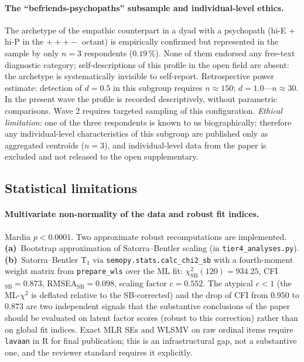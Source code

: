 \paragraph{The ``befriends-psychopaths'' subsample and individual-level ethics.}
\label{subsec:limitations_befriends}
The archetype of the empathic counterpart in a dyad with a psychopath (hi-E $+$ hi-P in the $+++-$ octant) is empirically confirmed but represented in the sample by only $n = 3$ respondents ($0.19\,\%$). None of them endorsed any free-text diagnostic category; self-descriptions of this profile in the open field are absent: the archetype is systematically invisible to self-report. Retrospective power estimate: detection of $d = 0.5$ in this subgroup requires $n \approx 150$; $d = 1.0$---$n \approx 30$. In the present wave the profile is recorded descriptively, without parametric comparisons. Wave 2 requires targeted sampling of this configuration. \emph{Ethical limitation:} one of the three respondents is known to us biographically; therefore any individual-level characteristics of this subgroup are published only as aggregated centroids ($n = 3$), and individual-level data from the paper is excluded and not released to the open supplementary.

\subsection{Statistical limitations}

\paragraph{Multivariate non-normality of the data and robust fit indices.} Mardia $p < 0.0001$. Two approximate robust recomputations are implemented. \textbf{(a)}~Bootstrap approximation of Satorra--Bentler scaling (in \texttt{tier4\_analyses.py}). \textbf{(b)}~Satorra--Bentler T$_1$ via \texttt{semopy.stats.calc\_chi2\_sb} with a fourth-moment weight matrix from \texttt{prepare\_wls} over the ML fit: $\chi^2_{\mathrm{SB}}(120) = 934.25$, CFI$_{\mathrm{SB}} = 0.873$, RMSEA$_{\mathrm{SB}} = 0.098$, scaling factor $c = 0.552$. The atypical $c < 1$ (the ML-$\chi^2$ is deflated relative to the SB-corrected) and the drop of CFI from $0.950$ to $0.873$ are two independent signals that the substantive conclusions of the paper should be evaluated on latent factor scores (robust to this correction) rather than on global fit indices. Exact MLR SEs and WLSMV on raw ordinal items require \texttt{lavaan} in R for final publication; this is an infrastructural gap, not a substantive one, and the reviewer standard requires it explicitly.

